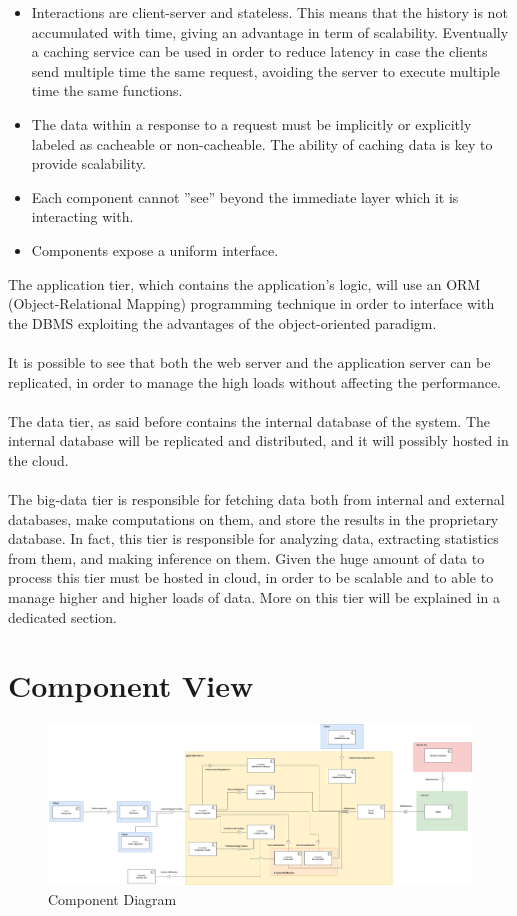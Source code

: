\documentclass[10pt]{report}
\begin{document}
\begin{itemize}
    \item Interactions are client-server and stateless. This means that the history is not accumulated with time, giving an advantage in term of scalability. Eventually a caching service can be used in order to reduce latency in case the clients send multiple time the same request, avoiding the server to execute multiple time the same functions.
    \item The data within a response to a request must be implicitly or explicitly labeled as cacheable or non-cacheable. The ability of caching data is key to provide scalability.
    \item Each component cannot ”see” beyond the immediate layer which it is interacting with.
    \item Components expose a uniform interface.
\end{itemize}
The application tier, which contains the application's logic, will use an ORM (Object-Relational Mapping) programming technique in order to interface with the DBMS exploiting the advantages of the object-oriented paradigm.\\ \\
It is possible to see that both the web server and the application server can be replicated, in order to manage the high loads without affecting the performance.\\ \\
The data tier, as said before contains the internal database of the system. The internal database will be replicated and distributed, and it will possibly hosted in the cloud.\\ \\
The big-data tier is responsible for fetching data both from internal and external databases, make computations on them, and store the results in the proprietary database. In fact, this tier is responsible for analyzing data, extracting statistics from them, and making inference on them. Given the huge amount of data to process this tier must be hosted in cloud, in order to be scalable and to able to manage higher and higher loads of data. More on this tier will be explained in a dedicated section.

\section{Component View}
\begin{figure}
    \centering
    \includegraphics[width=\paperwidth, angle=-90]{Component/ComponentDiagram.jpg}
    \caption{Component Diagram}
    \label{fig:component_diagram}
\end{figure}
\end{document}
